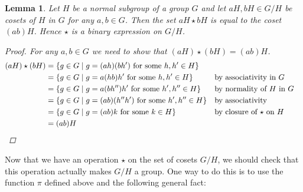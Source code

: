 \documentclass[12pt,letterpaper,DIV=11,final]{scrartcl}
\theoremstyle{plain}
\newtheorem{lemma}[theorem]{Lemma}
\theoremstyle{definition}
\theoremstyle{remark}
\begin{document}
\begin{lemma}
  Let $H$ be a normal subgroup of a group $G$ and let $aH, bH \in G/H$ be cosets of $H$ in $G$ for any $a, b \in G$.
  Then the set $aH \star bH$ is equal to the coset $(ab) H$.
  Hence $\star$ is a binary expression on $G/H$.

  \begin{proof}
    For any $a, b \in G$ we need to show that $(aH) \star (bH) = (ab)H$.
    \begin{align*}
      (aH) \star (bH) &= \{ g \in G \mid g = (ah)(bh') \text{ for some } h, h' \in H \} \\
                      &= \{ g \in G \mid g = a (hb) h' \text{ for some } h, h' \in H \}       && \text{by associativity in $G$} \\
                      &= \{ g \in G \mid g = a (bh'') h' \text{ for some } h', h'' \in H \}   && \text{by normality of $H$ in $G$} \\
                      &= \{ g \in G \mid g = (ab) (h'' h') \text{ for some } h', h'' \in H \} && \text{by associativity} \\
                      &= \{ g \in G \mid g = (ab) k \text{ for some } k \in H \}              && \text{by closure of $\star$ on $H$} \\
                      &= (ab) H                                                               && \qedhere
    \end{align*}
  \end{proof}
\end{lemma}

Now that we have an operation $\star$ on the set of cosets $G/H$, we should check that this operation actually makes $G/H$ a group.
One way to do this is to use the function $\pi$ defined above and the following general fact:
\end{document}

